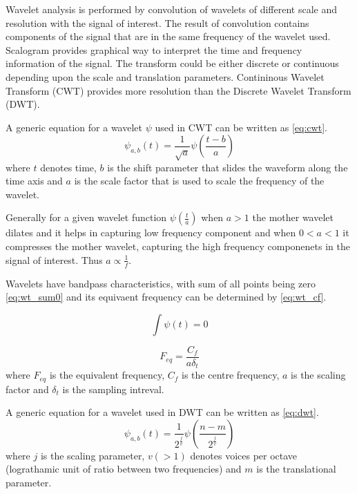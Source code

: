 Wavelet analysis is performed by convolution of wavelets of different scale and resolution with the signal of interest. The result of convolution contains components of the signal that are in the same frequency of the wavelet used. Scalogram provides graphical way to interpret the time and frequency information of the signal. The transform could be either discrete or continuous depending upon the scale and translation parameters. Contininous Wavelet Transform (CWT) provides more resolution than the Discrete Wavelet Transform (DWT).

A generic equation for a wavelet $\psi$ used in CWT can be written as \ref{eq:cwt}.
\begin{equation} \label{eq:cwt}
    \psi_{a,b}(t) = \frac{1}{\sqrt{a}} \psi( \frac{t - b}{a}) 
\end{equation}
where $t$ denotes time, $b$ is the shift parameter that slides the waveform along the time axis and $a$ is the scale factor that is used to scale the frequency of the wavelet.

Generally for a given wavelet function $\psi(\frac{t}{a})$ when $a > 1$ the mother wavelet dilates and it helps in capturing low frequency component and when $0 < a < 1$ it compresses the mother wavelet, capturing the high frequency componenets in the signal of interest. Thus $a \propto \frac{1}{f}$.

Wavelets have bandpass characteristics, with sum of all points being zero \ref{eq:wt_sum0} and its equivaent frequency can be determined by \ref{eq:wt_cf}.

\begin{equation} \label{eq:wt_sum0}
    \int\psi(t) = 0
\end{equation}

\begin{equation} \label{eq:wt_cf}
    F_{eq} = \frac{C_f}{a\delta_t}
\end{equation}
where $F_{eq}$ is the equivalent frequency, $C_f$ is the centre frequency, $a$ is the scaling factor and $\delta_t$ is the sampling intreval.

A generic equation for a wavelet used in DWT can be written as \ref{eq:dwt}.
\begin{equation} \label{eq:dwt}
    \psi_{a,b}(t) = \frac{1}{2^{\frac{j}{v}}} \psi( \frac{n - m}{2^{\frac{j}{v}}}) 
\end{equation}
where $j$ is the scaling parameter, $v(>1)$ denotes voices per octave (lograthamic unit of ratio between two frequencies) and $m$ is the translational parameter.


